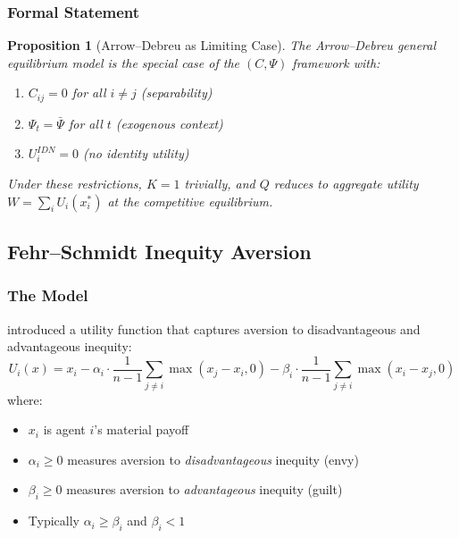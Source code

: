 \documentclass[12pt,a4paper]{article}
\newtheorem{proposition}[theorem]{Proposition}
\begin{document}
\subsubsection{Formal Statement}

\begin{proposition}[Arrow--Debreu as Limiting Case]
The Arrow--Debreu general equilibrium model is the special case of the $(C, \Psi)$ framework with:
\begin{enumerate}
  \item $C_{ij} = 0$ for all $i \neq j$ (separability)
  \item $\Psi_t = \bar{\Psi}$ for all $t$ (exogenous context)
  \item $U_i^{IDN} = 0$ (no identity utility)
\end{enumerate}
Under these restrictions, $K = 1$ trivially, and $Q$ reduces to aggregate utility
$W = \sum_i U_i(x_i^*)$ at the competitive equilibrium.
\end{proposition}

\subsection{Fehr--Schmidt Inequity Aversion}
\label{app:fehrschmidt}

\subsubsection{The Model}

\citet{fehrschmidt} introduced a utility function that captures
aversion to disadvantageous and advantageous inequity:
\begin{equation}
  U_i(x) = x_i - \alpha_i \cdot \frac{1}{n-1} \sum_{j \neq i} \max(x_j - x_i, 0)
         - \beta_i \cdot \frac{1}{n-1} \sum_{j \neq i} \max(x_i - x_j, 0)
  \label{eq:fsutility}
\end{equation}
where:
\begin{itemize}
  \item $x_i$ is agent $i$'s material payoff
  \item $\alpha_i \geq 0$ measures aversion to \emph{disadvantageous} inequity (envy)
  \item $\beta_i \geq 0$ measures aversion to \emph{advantageous} inequity (guilt)
  \item Typically $\alpha_i \geq \beta_i$ and $\beta_i < 1$
\end{itemize}
\end{document}
